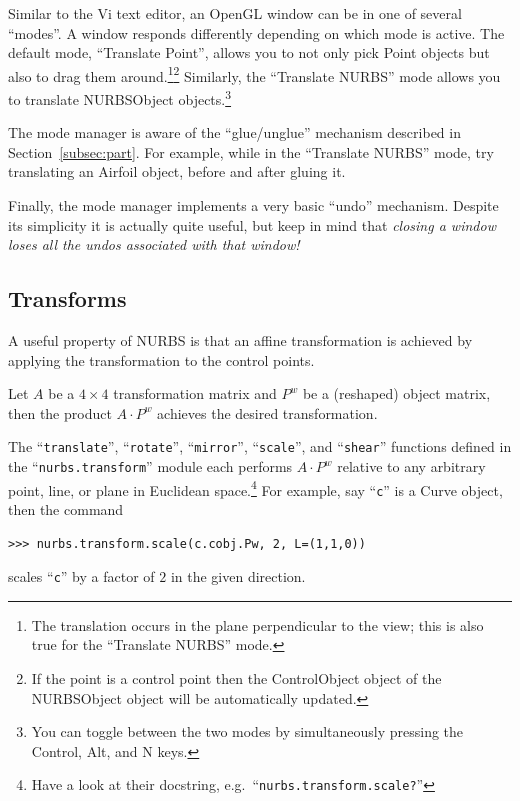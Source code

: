 \documentclass[]{article}
\begin{document}
Similar to the Vi text editor, an OpenGL window can be in one of several 
``modes''.  A window responds differently depending on which mode is 
active.  The default mode, ``Translate Point'', allows you to not only 
pick Point objects but also to drag them around.\footnote{The 
translation occurs in the plane perpendicular to the view; this is also 
true for the ``Translate NURBS'' mode.}\footnote{If the point is a 
control point then the ControlObject object of the NURBSObject object 
will be automatically updated.}  Similarly, the ``Translate NURBS'' mode 
allows you to translate NURBSObject objects.\footnote{You can toggle 
between the two modes by simultaneously pressing the Control, Alt, and N 
keys.}


The mode manager is aware of the ``glue/unglue'' mechanism described in 
Section~\ref{subsec:part}.  For example, while in the ``Translate 
NURBS'' mode, try translating an Airfoil object, before and after gluing 
it.

Finally, the mode manager implements a very basic ``undo'' mechanism.  
Despite its simplicity it is actually quite useful, but keep in mind 
that \emph{closing a window loses all the undos associated with that 
window!}

\subsection{Transforms}
\label{subsec:transforms}

A useful property of NURBS is that an affine transformation is achieved 
by applying the transformation to the control points.

Let $A$ be a $4 \times 4$ transformation matrix and $P^w$ be a 
(reshaped) object matrix, then the product $A \cdot P^w$ achieves the 
desired transformation.

The ``\texttt{translate}'', ``\texttt{rotate}'', ``\texttt{mirror}'', 
``\texttt{scale}'', and ``\texttt{shear}'' functions defined in the 
``\texttt{nurbs.transform}'' module each performs $A \cdot P^w$ relative 
to any arbitrary point, line, or plane in Euclidean space.\footnote{Have 
a look at their docstring, e.g.\ ``\texttt{nurbs.transform.scale?}''}  
For example, say ``\texttt{c}'' is a Curve object, then the command
\begin{verbatim}
>>> nurbs.transform.scale(c.cobj.Pw, 2, L=(1,1,0))
\end{verbatim}
scales ``\texttt{c}'' by a factor of $2$ in the given direction.
\end{document}
